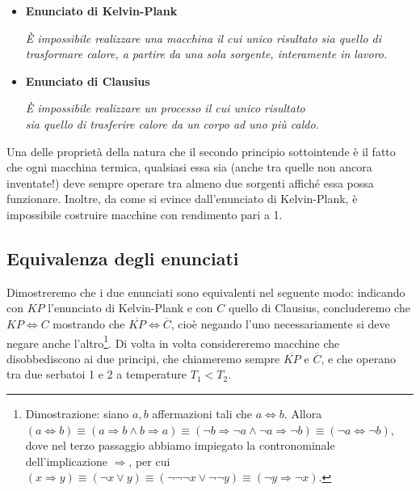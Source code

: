 \begin{tcolorbox}[colback = red!30, colframe = red!30!black, title = {Enunciati del secondo principio della termodinamica}]
    \begin{itemize}
        \item \textbf{Enunciato di Kelvin-Plank}
        
        \begin{center}
            \textit{È impossibile realizzare una macchina il cui unico risultato
            sia quello di trasformare calore, a partire da una sola sorgente, interamente in lavoro.}
        \end{center}
    
        \item \textbf{Enunciato di Clausius}
        
        \begin{center}
            \textit{È impossibile realizzare un processo il cui unico risultato\\
            sia quello di trasferire calore da un corpo ad uno più caldo.}
        \end{center}
    \end{itemize}
\end{tcolorbox}

\noindent Una delle proprietà della natura che il secondo principio sottointende
è il fatto che ogni macchina termica, qualsiasi essa sia (anche tra quelle non ancora
inventate!) deve sempre operare tra almeno due sorgenti affiché essa possa
funzionare. Inoltre, da come si evince dall'enunciato di Kelvin-Plank, è impossibile
costruire macchine con rendimento pari a 1.

\subsection{Equivalenza degli enunciati}
Dimostreremo che i due enunciati sono equivalenti nel seguente modo:
indicando con $KP$ l'enunciato di Kelvin-Plank e con $C$ quello di
Clausius, concluderemo che $KP \Leftrightarrow C$ mostrando che
$\overline{KP} \Leftrightarrow \overline{C}$, cioè negando l'uno necessariamente
si deve negare anche l'altro\footnote{Dimostrazione: siano $a,b$ affermazioni
tali che $a \Leftrightarrow b$. Allora $(a \Leftrightarrow b) \equiv (a \Rightarrow b
\wedge b \Rightarrow a) \equiv (\lnot b \Rightarrow \lnot a \land \lnot a \Rightarrow \lnot b) \equiv (\lnot a \Leftrightarrow \lnot b)$,
dove nel terzo passaggio abbiamo impiegato la contronominale dell'implicazione $\Rightarrow$,
per cui $(x \Rightarrow y) \equiv (\lnot x \lor y) \equiv (\lnot\lnot\lnot x \lor \lnot\lnot y) \equiv (\lnot y \Rightarrow \lnot x)$.}. Di volta in volta
considereremo macchine che disobbediscono ai due principi, che chiameremo
sempre $\overline{KP}$ e $\overline{C}$, e che operano tra due
serbatoi 1 e 2 a temperature $T_1 < T_2$.

